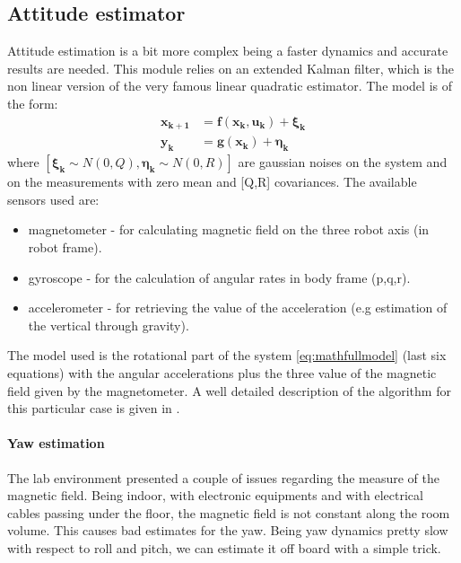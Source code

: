 \subsection{Attitude estimator}

Attitude estimation is a bit more complex being a faster dynamics and accurate results are needed. This module relies on an extended Kalman filter, which is the non linear version of the very famous linear quadratic estimator. The model is of the form:
\begin{equation}
	\begin{aligned}
	\boldsymbol{x_{k+1}}& = \boldsymbol{f(\boldsymbol{x_k}, \boldsymbol{u_k})} + \boldsymbol{\xi_k} \\
	\boldsymbol{y_k}& = \boldsymbol{ g(\boldsymbol{x_k}) } + \boldsymbol{\eta_k}
	\end{aligned}
\end{equation}
where $[\boldsymbol{\xi_k} \sim N(0,Q), \boldsymbol{\eta_k} \sim N(0,R) ]$ are gaussian noises on the system and on the measurements with zero mean and [Q,R] covariances. The available sensors used are: \begin{itemize}
	\item magnetometer - for calculating magnetic field on the three robot axis (in robot frame).
	\item gyroscope - for the calculation of angular rates in body frame (p,q,r).
	\item accelerometer - for retrieving the value of the acceleration (e.g estimation of the vertical through gravity).
	\end{itemize}

\noindent
The model used is the rotational part of the system \ref{eq:mathfullmodel} (last six equations) with the angular accelerations plus the three value of the magnetic field given by the magnetometer. A well detailed description of the algorithm for this particular case is given in \cite{attekf}.

\noindent
\paragraph{Yaw estimation} The lab environment presented a couple of issues regarding the measure of the magnetic field. Being indoor, with electronic equipments and with electrical cables passing under the floor, the magnetic field is not constant along the room volume. This causes bad estimates for the yaw. Being yaw dynamics pretty slow with respect to roll and pitch, we can estimate it off board with a simple trick.\\

